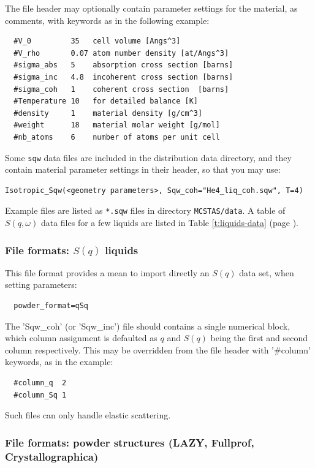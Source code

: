The file header may optionally contain parameter settings for the material, as comments, with keywords as in the following example:
\begin{lstlisting}
  #V_0         35   cell volume [Angs^3]
  #V_rho       0.07 atom number density [at/Angs^3]
  #sigma_abs   5    absorption cross section [barns]
  #sigma_inc   4.8  incoherent cross section [barns]
  #sigma_coh   1    coherent cross section  [barns]
  #Temperature 10   for detailed balance [K]
  #density     1    material density [g/cm^3]
  #weight      18   material molar weight [g/mol]
  #nb_atoms    6    number of atoms per unit cell
\end{lstlisting}
Some \verb+sqw+ data files are included in the \MCS distribution data directory, and they contain material parameter settings in their header, so that you may use:
\begin{lstlisting}
Isotropic_Sqw(<geometry parameters>, Sqw_coh="He4_liq_coh.sqw", T=4)
\end{lstlisting}

Example files are listed as \verb+*.sqw+ files in directory \verb+MCSTAS/data+. A table of $S(q,\omega)$ data files for a few liquids are listed in Table \ref{t:liquids-data} (page \pageref{t:liquids-data}).

\subsubsection{File formats: $S(q)$ liquids}

This file format provides a mean to import directly an $S(q)$ data set, when setting parameters:
\begin{lstlisting}
  powder_format=qSq
\end{lstlisting}
The 'Sqw\_coh' (or 'Sqw\_inc') file should contains a single numerical block, which column assignment is defaulted as $q$ and $S(q)$ being the first and second column respectively. This may be overridden from the file header with '\#column' keywords, as in the example:
\begin{lstlisting}
  #column_q  2
  #column_Sq 1
\end{lstlisting}
Such files can only handle elastic scattering.

\subsubsection{File formats: powder structures (LAZY, Fullprof, Crystallographica)}

